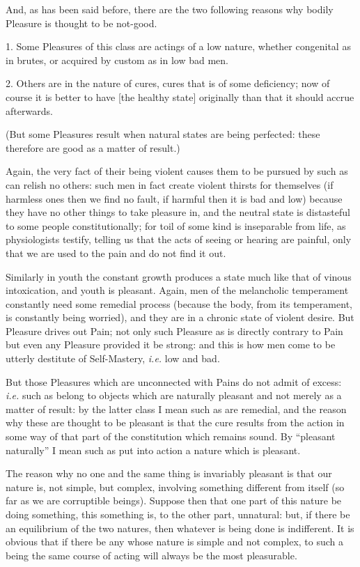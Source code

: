 And, as has been said before, there are the two following reasons why bodily
Pleasure is thought to be not-good.

1. Some Pleasures of this class are actings of a low nature, whether congenital
as in brutes, or acquired by custom as in low bad men.

2. Others are in the nature of cures, cures that is of some deficiency; now of
course it is better to have [the healthy state] originally than that it should
accrue afterwards.

(But some Pleasures result when natural states are being perfected: these
therefore are good as a matter of result.)

Again, the very fact of their being violent causes them to be pursued by such
as can relish no others: such men in fact create violent thirsts for themselves
(if harmless ones then we find no fault, if harmful then it is bad and low)
because they have no other things to take pleasure in, and the neutral state is
distasteful to some people constitutionally; for toil of some kind is
inseparable from life, as physiologists testify, telling us that the acts of
seeing or hearing are painful, only that we are used to the pain and do not
find it out.

Similarly in youth the constant growth produces a state much like that of
vinous intoxication, and youth is pleasant. Again, men of the melancholic
temperament constantly need some remedial process (because the body, from its
temperament, is constantly being worried), and they are in a chronic state of
violent desire. But Pleasure drives out Pain; not only such Pleasure as is
directly contrary to Pain but even any Pleasure provided it be strong: and this
is how men come to be utterly destitute of Self-Mastery, \emph{i.e.} low and
bad.

But those Pleasures which are unconnected with Pains do not admit of excess:
\emph{i.e.} such as belong to objects which are naturally pleasant and not
merely as a matter of result: by the latter class I mean such as are remedial,
and the reason why these are thought to be pleasant is that the cure results
from the action in some way of that part of the constitution which remains
sound. By “pleasant naturally” I mean such as put into action a
nature which is pleasant.

The reason why no one and the same thing is invariably pleasant is that our
nature is, not simple, but complex, involving something different from itself
(so far as we are corruptible beings). Suppose then that one part of this
nature be doing something, this something is, to the other part, unnatural:
but, if there be an equilibrium of the two natures, then whatever is being done
is indifferent. It is obvious that if there be any whose nature is simple and
not complex, to such a being the same course of acting will always be the most
pleasurable.

